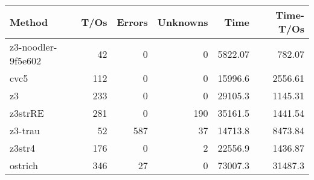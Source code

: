 \begin{tabular}{lrrrrr}
\hline
 Method             &   T/Os &   Errors &   Unknowns &     Time &   Time-T/Os \\
\hline
 z3-noodler-9f5e602 &     42 &        0 &          0 &  5822.07 &      782.07 \\
 cvc5               &    112 &        0 &          0 & 15996.6  &     2556.61 \\
 z3                 &    233 &        0 &          0 & 29105.3  &     1145.31 \\
 z3strRE            &    281 &        0 &        190 & 35161.5  &     1441.54 \\
 z3-trau            &     52 &      587 &         37 & 14713.8  &     8473.84 \\
 z3str4             &    176 &        0 &          2 & 22556.9  &     1436.87 \\
 ostrich            &    346 &       27 &          0 & 73007.3  &    31487.3  \\
\hline
\end{tabular}
